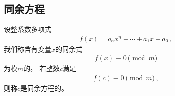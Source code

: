\subsection{同余方程}\label{sub:同余方程}
\begin{definition}
    设整系数多项式
    \begin{align}
        f(x)=a_nx^n+\cdots+a_1x+a_0\, ,
    \end{align}
    我们称含有变量$x$的同余式
    \begin{align}\label{eq:7.ex02.congruenceequation}
        f(x)\equiv0\pmod{m}
    \end{align}
    为模$m$的。
    若整数$c$满足
    \begin{align}
        f(c)\equiv0\pmod{m}\, ,
    \end{align}
    则称$c$是同余方程的。
\end{definition}

